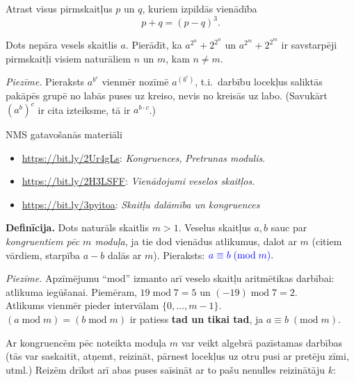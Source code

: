 \documentclass[a4paper,12pt]{article}
\begin{document}
\vspace{10pt}
\begin{problem}
Atrast visus pirmskaitļus $p$ un $q$, kuriem izpildās vienādība
$$p + q = (p - q)^3.$$
\end{problem}


\vspace{20pt}
\begin{problem}
Dots nepāra vesels skaitlis $a$. Pierādīt, ka ${\displaystyle a^{2^n} + 2^{2^n}}$
un ${\displaystyle a^{2^m} + 2^{2^m}}$ ir savstarpēji pirmskaitļi visiem naturāliem 
$n$ un $m$, kam $n \neq m$. 
\end{problem}


\vspace{5pt}
{\em Piezīme.} Pieraksts $a^{b^c}$ vienmēr nozīmē $a^{(b^c)}$, t.i.\ darbību locekļus saliktās pakāpēs
grupē no labās puses uz kreiso, nevis no kreisās uz labo.
(Savukārt $(a^b)^c$ ir cita izteiksme, tā ir $a^{b \cdot c}$.)

\newpage

NMS gatavošanās materiāli

\begin{itemize}
\item \url{https://bit.ly/2Ur4gLs}: {\em Kongruences},  {\em Pretrunas modulis}. 
\item \url{https://bit.ly/2H3LSFF}: {\em Vienādojumi veselos skaitļos}.
\item \url{https://bit.ly/3pyitoa}: {\em Skaitļu dalāmība un kongruences}
\end{itemize}


\vspace{10pt}
{\bf Definīcija.} Dots naturāls skaitlis $m > 1$. Veselus skaitļus $a,b$ sauc par 
{\em kongruentiem pēc $m$ moduļa}, ja tie dod vienādus atlikumus, dalot ar $m$ 
(citiem vārdiem, starpība $a-b$ dalās ar $m$). Pieraksts: $\textcolor{blue}{a \equiv b\;(\text{mod}\;m)}.$

\vspace{5pt}
{\em Piezīme.} Apzīmējumu ``mod'' izmanto arī veselo skaitļu aritmētikas darbībai: atlikuma iegūšanai. 
Piemēram, $19\;\text{mod}\;7 = 5$ un $(-19)\;\text{mod}\;7 = 2$.\\
Atlikums vienmēr pieder intervālam $\{0,\ldots,m-1\}$.\\
$(a\;\text{mod}\;m) = (b\;\text{mod}\;m)$ ir patiess {\bf tad un tikai tad}, ja $a \equiv b\;(\text{mod}\;m)$.

Ar kongruencēm pēc noteikta moduļa $m$ var veikt algebrā pazīstamas darbības (tās var saskaitīt, 
atņemt, reizināt, pārnest locekļus uz otru pusi ar pretēju zīmi, utml.) Reizēm drīkst arī abas puses saīsināt
ar to pašu nenulles reizinātāju $k$:
\end{document}
